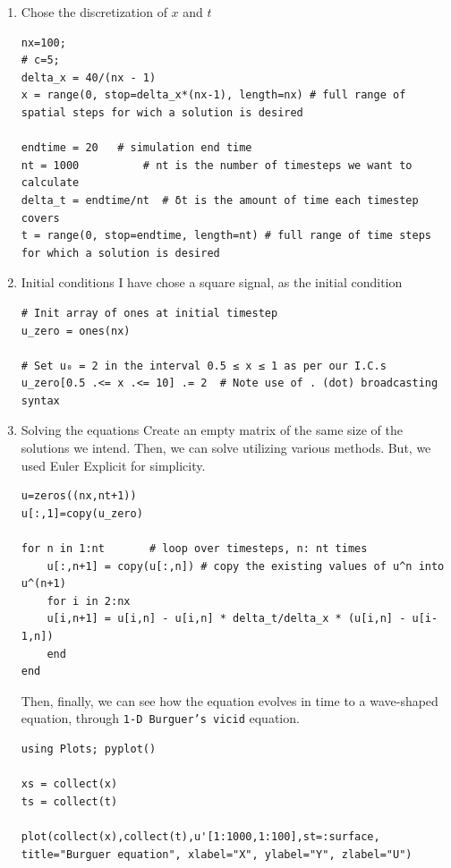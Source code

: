 \documentclass[11pt]{article}
\begin{document}
\begin{enumerate}
\item Chose the discretization of \(x\) and \(t\)
\label{sec:org0c3b23f}
\begin{verbatim}
nx=100;
# c=5;
delta_x = 40/(nx - 1)
x = range(0, stop=delta_x*(nx-1), length=nx) # full range of spatial steps for wich a solution is desired

endtime = 20   # simulation end time
nt = 1000          # nt is the number of timesteps we want to calculate
delta_t = endtime/nt  # δt is the amount of time each timestep covers
t = range(0, stop=endtime, length=nt) # full range of time steps for which a solution is desired
\end{verbatim}

\item Initial conditions
\label{sec:org6fec842}
I have chose a square signal, as the initial condition
\begin{verbatim}
# Init array of ones at initial timestep
u_zero = ones(nx)

# Set u₀ = 2 in the interval 0.5 ≤ x ≤ 1 as per our I.C.s
u_zero[0.5 .<= x .<= 10] .= 2  # Note use of . (dot) broadcasting syntax
\end{verbatim}

\item Solving the equations
\label{sec:orgc403b62}
Create an empty matrix of the same size of the solutions we
intend. Then, we can solve utilizing various methods. But, we used
Euler Explicit for simplicity. 

\begin{verbatim}
u=zeros((nx,nt+1))
u[:,1]=copy(u_zero)

for n in 1:nt       # loop over timesteps, n: nt times
    u[:,n+1] = copy(u[:,n]) # copy the existing values of u^n into u^(n+1)
    for i in 2:nx 
	u[i,n+1] = u[i,n] - u[i,n] * delta_t/delta_x * (u[i,n] - u[i-1,n])
    end
end
\end{verbatim}

Then, finally, we can see how the equation evolves in time to a
wave-shaped equation, through \texttt{1-D Burguer's vicid} equation.
\begin{verbatim}
using Plots; pyplot()

xs = collect(x)
ts = collect(t)

plot(collect(x),collect(t),u'[1:1000,1:100],st=:surface, title="Burguer equation", xlabel="X", ylabel="Y", zlabel="U")
\end{verbatim}
\end{enumerate}
\end{document}
